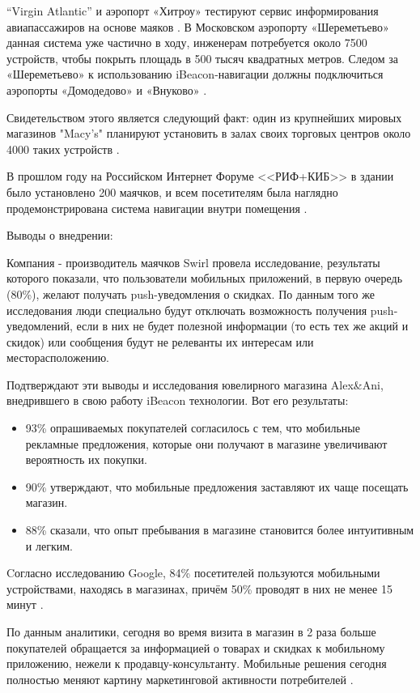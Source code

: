 “Virgin Atlantic” и аэропорт «Хитроу» тестируют сервис информирования авиапассажиров на основе маяков \cite{web:Heathrow}. В Московском аэропорту «Шереметьево» данная система уже частично в ходу, инженерам потребуется около 7500 устройств, чтобы покрыть площадь в 500 тысяч квадратных метров. Следом за «Шереметьево» к использованию iBeacon-навигации должны подключиться аэропорты «Домодедово» и «Внуково» \cite{web:Aeroports}.

Свидетельством этого является следующий факт: один из крупнейших мировых магазинов "Macy's"  планируют установить в залах своих торговых центров около 4000 таких устройств \cite{web:Macy}. 

В прошлом году на Российском Интернет Форуме <<РИФ+КИБ>> в здании было установлено 200 маячков, и всем посетителям была наглядно продемонстрирована система навигации внутри помещения \cite{web:RifKib}.

Выводы о внедрении:

Компания - производитель маячков Swirl провела исследование, результаты которого показали, что пользователи мобильных приложений, в первую очередь (80\%), желают получать push-уведомления о скидках. По данным того же исследования люди специально будут отключать возможность получения push-уведомлений, если в них не будет полезной информации (то есть тех же акций и скидок) или сообщения будут не релеванты их интересам или месторасположению.

Подтверждают эти выводы и исследования ювелирного магазина Alex\&Ani, внедрившего в свою работу iBeacon технологии. Вот его результаты:
\begin{itemize}
    \item
    93\% опрашиваемых покупателей согласилось с тем, что мобильные рекламные предложения, которые они получают в магазине увеличивают вероятность их покупки.
    \item
    90\% утверждают, что мобильные предложения заставляют их чаще посещать магазин.
    \item
    88\% сказали, что опыт пребывания в магазине становится более интуитивным и легким.
\end{itemize}

Cогласно исследованию Google, 84\% посетителей пользуются мобильными устройствами, находясь в магазинах, причём 50\% проводят в них не менее 15 минут \cite{web:GoogleShopExpirience}.

По данным аналитики, сегодня во время визита в магазин в 2 раза больше покупателей обращается за информацией о товарах и скидках к мобильному приложению, нежели к продавцу-консультанту. Мобильные решения сегодня полностью меняют картину маркетинговой активности потребителей \cite{web:CasesZero}.